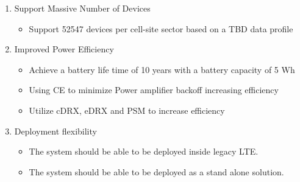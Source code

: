 \begin{itemize}
\begin{enumerate}[resume]
\begin{itemize}
		\end{itemize}
	\item Support Massive Number of Devices 
		\begin{itemize}
		\item Support 52547 devices per cell-site sector based on a TBD data profile
		\end{itemize}
	\item Improved Power Efficiency
		\begin{itemize}
		\item  Achieve a battery life time of 10 years with a battery capacity of 5 Wh
		\item Using \gls{CE} to minimize Power amplifier backoff increasing efficiency
		\item Utilize \gls{cDRX}, \gls{eDRX} and \gls{PSM} to increase efficiency
	\end{itemize}
	\item Deployment flexibility
		\begin{itemize}
		\item The system should be able to be deployed inside legacy \gls{LTE}.
		\item The system should be able to be deployed as a stand alone solution.
		\end{itemize}
	\end{enumerate}
\end{itemize}


